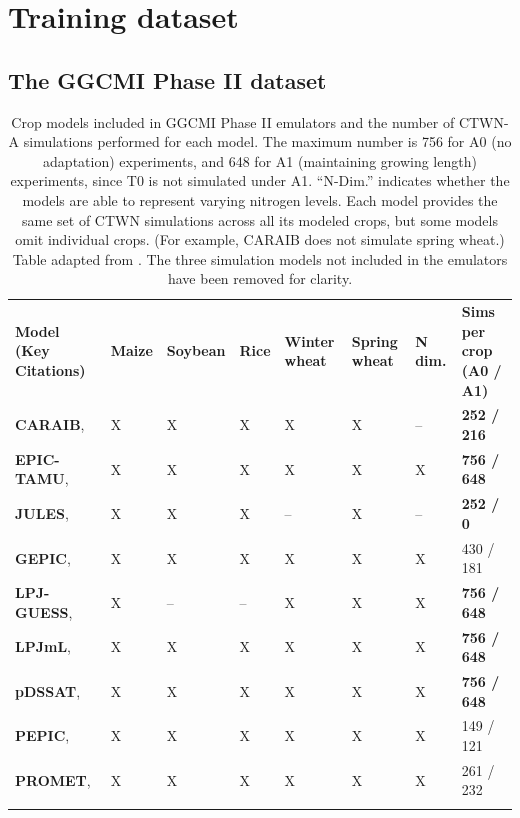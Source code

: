 \documentclass[gmd, manuscript]{copernicus} %
\begin{document}
\section{Training dataset}
\label{S:2}
\subsection{The GGCMI Phase II dataset}
\begin{table}[t]
\caption{
Crop models included in GGCMI Phase II emulators and the number of CTWN-A simulations performed for each model. 
The maximum number is 756 for A0 (no adaptation) experiments, and 648 for A1 (maintaining growing length) experiments, since T0 is not simulated under A1. ``N-Dim.'' indicates whether the models are able to represent varying nitrogen levels.
Each model provides the same set of CTWN simulations across all its modeled crops, but some models omit individual crops. 
(For example, CARAIB does not simulate spring wheat.)
Table adapted from \citet{Franke2019a}. 
The three simulation models not included in the emulators have been removed for clarity.
}
\label{table:models}
  \begin{tabular}{p{6cm} p{1cm} p{1cm} p{1cm} p{1cm} p{1cm} p{1cm} p{1.9cm}}
    \tophline
    {\textbf{Model (Key Citations)}}&{\textbf{Maize}}&{\textbf{Soybean}}&{\textbf{Rice}}&{\textbf{Winter wheat}}&{\textbf{Spring wheat}}&{\textbf{N dim.}}&{\textbf{Sims per crop (A0 / A1)}}\\ \middlehline
    {\textbf{CARAIB},    \citet{Dury2011, Pirttioja2015}}  & {X} & {X} & {X} & {X} & {X} & {--} & {\textbf{252 / 216}}\\ \middlehline
    {\textbf{EPIC-TAMU}, \citet{Izaurralde06}} & {X} & {X} & {X} & {X} & {X} & {X} & {\textbf{756 / 648}}\\ \middlehline
    {\textbf{JULES},     \citet{Osborne2015, Williams2015, Williams2017}} & {X} & {X} & {X} & {--} & {X} & {--} & {\textbf{252 / 0}}\\ \middlehline
    {\textbf{GEPIC},     \citet{LIU2007478, FOLBERTH201221}} & {X} & {X} & {X} & {X} & {X} & {X} & {430 / 181}\\ \middlehline
    {\textbf{LPJ-GUESS}, \citet{Lindeskog2013, Olin2015}} & {X} & {--} & {--} & {X} & {X} & {X} & {\textbf{756 / 648}}\\  \middlehline
    {\textbf{LPJmL},     \citet{von_Bloh_implementing_2018}} & {X} & {X} & {X} & {X} & {X} & {X} & {\textbf{756 / 648}}\\ \middlehline
    {\textbf{pDSSAT},    \citet{Elliott2014b, JONES2003235}} & {X} & {X} & {X} & {X} & {X} & {X} & {\textbf{756 / 648}}\\ \middlehline
    {\textbf{PEPIC},     \citet{LIU2016164, LIU2016}}  & {X} & {X} & {X} & {X} & {X} & {X} & {149 / 121}\\ \middlehline
    {\textbf{PROMET},    \citet{Hank2015, MAUSER2015}} & {X} & {X} & {X} & {X} & {X} & {X} & {261 / 232}\\
    \bottomhline
  \end{tabular}
\end{table}
\end{document}
